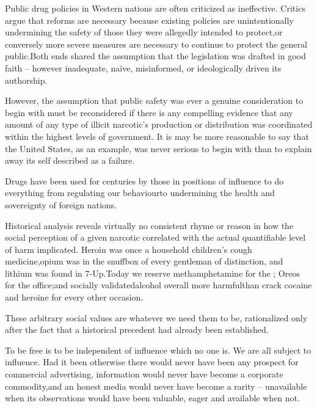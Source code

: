 Public drug policies in Western nations are often criticized as ineffective. Critics argue that reforms are necessary because existing policies are unintentionally undermining the safety of those they were allegedly intended to protect, or conversely more severe measures are necessary to continue to protect the general public. Both ends shared the assumption that the legislation was drafted in good faith -- however inadequate, naïve, misinformed, or ideologically driven its authorship. 

However, the assumption that public safety was ever a genuine consideration to begin with must be reconsidered if there is any compelling evidence that any amount of any type of illicit narcotic's production or distribution was coordinated within the highest levels of government. It is may be more reasonable to say that the United States, as an example, was never serious to begin with than to explain away its self described  as a failure.

Drugs have been used for centuries by those in positions of influence to do everything from regulating our behaviour\footnotecite[wilson2007] to undermining the health and sovereignty of foreign nations. 

Historical analysis reveals virtually no consistent rhyme or reason in how the social perception of a given narcotic correlated with the actual quantifiable level of harm implicated. Heroin was once a household children's cough medicine, opium was in the snuffbox of every gentleman of distinction, and lithium was found in 7-Up. Today we reserve methamphetamine for the ; Oreos for the office; and socially validated alcohol overall more harmful\footnotecite[extras={ See figure 2.}][nutt2010] than crack cocaine and heroine for every other occasion. 

These arbitrary social values are whatever we need them to be, rationalized only after the fact that a historical precedent had already been established.


To be free is to be independent of influence which no one is. We are all subject to influence. Had it been otherwise there would never have been any prospect for commercial advertising, information would never have become a corporate commodity,\footnotecite[santoso2008]\footnotecite[nagata2011] and an honest media would never have become a rarity -- unavailable when its observations would have been valuable,
eager and available when not.

